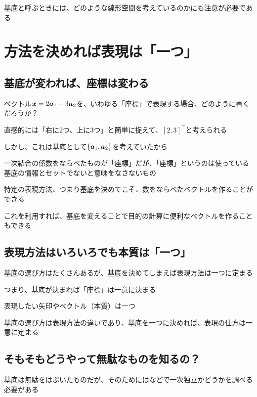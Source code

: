 \documentclass[../book_half_step_linear]{subfiles}
\begin{document}
\br

基底と呼ぶときには、どのような線形空間を考えているのかにも注意が必要である

\section{方法を決めれば表現は「一つ」}

\subsection{基底が変われば、座標は変わる}

ベクトル$\vb*{x}=2\vb*{a}_1 + 3\vb*{a}_2$を、いわゆる「座標」で表現する場合、どのように書くだろうか？

直感的には「右に2つ、上に3つ」と簡単に捉えて、$[2,3]^\top$と考えられる

しかし、これは基底として$\{ \vb*{a}_1, \vb*{a}_2 \}$を考えていたから

\br

一次結合の係数をならべたものが「座標」だが、「座標」というのは使っている基底の情報とセットでないと意味をなさないもの

特定の表現方法、つまり基底を決めてこそ、数をならべたベクトルを作ることができる

\br

これを利用すれば、基底を変えることで目的の計算に便利なベクトルを作ることもできる

\sectionline
\subsection{表現方法はいろいろでも本質は「一つ」}

基底の選び方はたくさんあるが、基底を決めてしまえば表現方法は一つに定まる

つまり、基底が決まれば「座標」は一意に決まる

\br

表現したい矢印やベクトル（本質）は一つ

基底の選び方は表現方法の違いであり、基底を一つに決めれば、表現の仕方は一意に定まる

\sectionline
\subsection{そもそもどうやって無駄なものを知るの？}

基底は無駄をはぶいたものだが、そのためにはなどで一次独立かどうかを調べる必要がある
\end{document}
